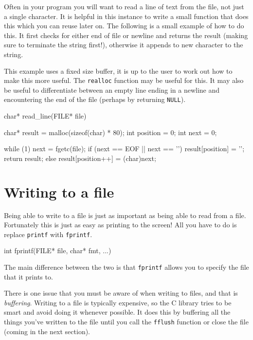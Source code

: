 Often in your program you will want to read a line of text from the file, not just a single character.
It is helpful in this instance to write a small function that does this which you can reuse later on.
The following is a small example of how to do this.
It first checks for either end of file or newline and returns the result (making sure to terminate the string first!), otherwise it appends to new character to the string.

This example uses a fixed size buffer, it is up to the user to work out how to make this more useful.
The \texttt{realloc} function may be useful for this.
It may also be useful to differentiate between an empty line ending in a newline and encountering the end of the file (perhaps by returning \texttt{NULL}).

\begin{codeblock}
char* read_line(FILE* file)
{
    char* result = malloc(sizeof(char) * 80);
    int position = 0;
    int next = 0;

    while (1) {
        next = fgetc(file);
        if (next == EOF || next == '\n') {
            result[position] = '\0';
            return result;
        } else {
            result[position++] = (char)next;
        }
    }
}
\end{codeblock}

\section{Writing to a file}

Being able to write to a file is just as important as being able to read from a file.
Fortunately this is just as easy as printing to the screen!
All you have to do is replace \texttt{printf} with \texttt{fprintf}.

\begin{codeinline}
int fprintf(FILE* file, char* fmt, ...)
\end{codeinline}

The main difference between the two is that \texttt{fprintf} allows you to specify the file that it prints to.

There is one issue that you must be aware of when writing to files, and that is \emph{buffering}. 
Writing to a file is typically expensive, so the C library tries to be smart and avoid doing it whenever possible.
It does this by buffering all the things you've written to the file until you call the \texttt{fflush} function or close the file (coming in the next section).

